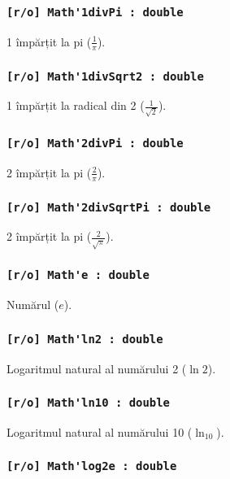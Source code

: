 \subsubsection{\lstinline|[r/o] Math'1divPi : double|}

1 împărțit la pi ($\frac{1}{\pi}$).

\subsubsection{\lstinline|[r/o] Math'1divSqrt2 : double|}

1 împărțit la radical din 2 ($\frac{1}{\sqrt{2}}$).

\subsubsection{\lstinline|[r/o] Math'2divPi : double|}

2 împărțit la pi ($\frac{2}{\pi}$).

\subsubsection{\lstinline|[r/o] Math'2divSqrtPi : double|}

2 împărțit la pi ($\frac{2}{\sqrt{\pi}}$).

\subsubsection{\lstinline|[r/o] Math'e : double|}

Numărul ($e$).

\subsubsection{\lstinline|[r/o] Math'ln2 : double|}

Logaritmul natural al numărului 2 ($\ln{2}$).

\subsubsection{\lstinline|[r/o] Math'ln10 : double|}

Logaritmul natural al numărului 10 ($\ln_{10}$).

\subsubsection{\lstinline|[r/o] Math'log2e : double|}

